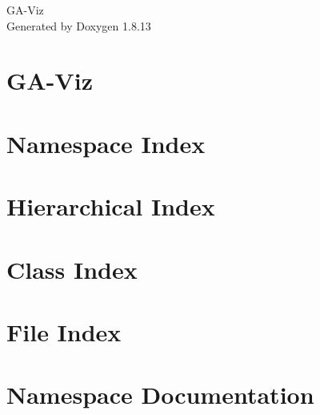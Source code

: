 \documentclass[twoside]{book}
\newcommand{\+}{\discretionary{\mbox{\scriptsize$\hookleftarrow$}}{}{}}
\newcommand{\clearemptydoublepage}{%
  \newpage{\pagestyle{empty}\cleardoublepage}%
}
\begin{document}
\hypersetup{pageanchor=false,
             bookmarksnumbered=true,
             pdfencoding=unicode
            }
\begin{titlepage}
\vspace*{7cm}
\begin{center}%
{\Large G\+A-\/\+Viz }\\
\vspace*{1cm}
{\large Generated by Doxygen 1.8.13}\\
\end{center}
\end{titlepage}
\clearemptydoublepage
{}
\tableofcontents
\clearemptydoublepage
{}
\hypersetup{pageanchor=true}

\chapter{G\+A-\/\+Viz}
\label{md__home_vicor__bureau__g_a-_viz-master__r_e_a_d_m_e}

\chapter{Namespace Index}

\chapter{Hierarchical Index}

\chapter{Class Index}

\chapter{File Index}

\chapter{Namespace Documentation}

\end{document}
